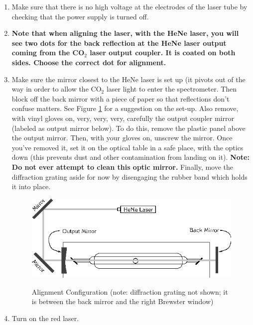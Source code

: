 \documentclass{../lab}
\begin{document}
\begin{enumerate}
    \item Make sure that there is no high voltage at the electrodes of the laser tube by checking that the power supply is turned off.

    \item \textbf{Note that when aligning the laser, with the HeNe laser, you will see two dots for the back reflection at the HeNe laser output coming from the CO$_2$ laser output coupler.  It is coated on both sides. Choose the correct dot for alignment.}

    \item Make sure the mirror closest to the HeNe laser is set up (it pivots out of the way in order to allow the CO$_2$ laser light to enter the spectrometer. Then block off the back mirror with a piece of paper so that reflections don't confuse matters. See Figure \ref{fig:AlignmentConfiguration} for a suggestion on the set-up. Also remove, with vinyl gloves on, very, very, very, carefully the output coupler mirror (labeled as output mirror below). To do this, remove the plastic panel above the output mirror. Then, with your gloves on, unscrew the mirror. Once you've removed it, set it on the optical table in a safe place, with the optics down (this prevents dust and other contamination from landing on it). \textbf{Note: Do not ever attempt to clean this optic mirror.} Finally, move the diffraction grating aside for now by disengaging the rubber band which holds it into place. 

    \begin{figure}[h]
        \centering
        \href{http://experimentationlab.berkeley.edu/sites/default/files/images/CO24.gif}{\includegraphics[width=0.7\linewidth]{images/CO24.png}}
        \caption{Alignment Configuration (note: diffraction grating not shown; it is between the back mirror and the right Brewster window)}
        \label{fig:AlignmentConfiguration}
    \end{figure}

    \item Turn on the red laser.


\end{enumerate}
\end{document}
